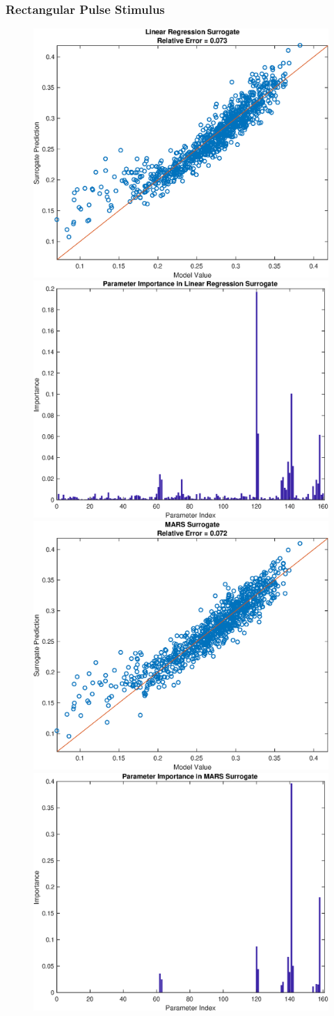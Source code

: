 \documentclass[12pt]{article}
\numberwithin{equation}{section}
\begin{document}
\subsubsection{Rectangular Pulse Stimulus}

\begin{figure}[h]
\centering
\includegraphics[width=.49 \textwidth]{Figures/AM_AMp_Min_QoI_LR_Prediction_Rectangular.eps}
\includegraphics[width=.49 \textwidth]{Figures/AM_AMp_Min_QoI_LR_VI_Rectangular.eps}\\
\includegraphics[width=.49 \textwidth]{Figures/AM_AMp_Min_QoI_MARS_Prediction_Rectangular.eps}
\includegraphics[width=.49 \textwidth]{Figures/AM_AMp_Min_QoI_MARS_VI_Rectangular.eps}
\end{figure}
\end{document}

